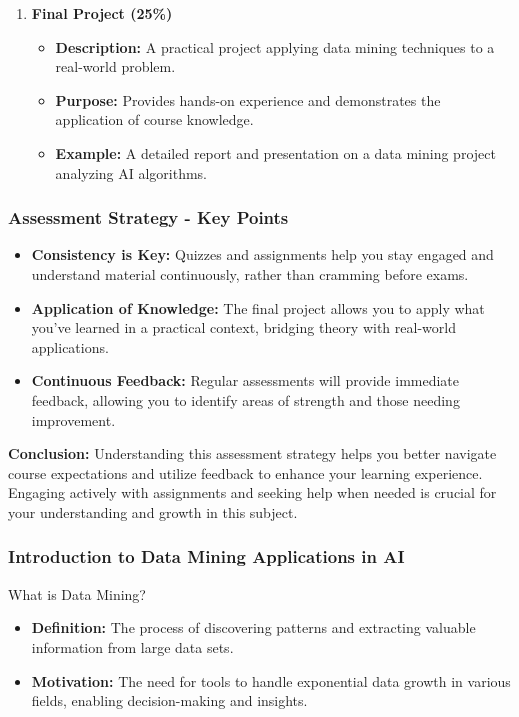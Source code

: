 \documentclass[aspectratio=169]{beamer}
\begin{document}
\begin{frame}[fragile]
\begin{enumerate}
        \item \textbf{Final Project (25\%)}
            \begin{itemize}
                \item \textbf{Description:} A practical project applying data mining techniques to a real-world problem.
                \item \textbf{Purpose:} Provides hands-on experience and demonstrates the application of course knowledge.
                \item \textbf{Example:} A detailed report and presentation on a data mining project analyzing AI algorithms.
            \end{itemize}
    \end{enumerate}
\end{frame}

\begin{frame}[fragile]
    \frametitle{Assessment Strategy - Key Points}
    \begin{itemize}
        \item \textbf{Consistency is Key:} Quizzes and assignments help you stay engaged and understand material continuously, rather than cramming before exams.
        
        \item \textbf{Application of Knowledge:} The final project allows you to apply what you've learned in a practical context, bridging theory with real-world applications.
        
        \item \textbf{Continuous Feedback:} Regular assessments will provide immediate feedback, allowing you to identify areas of strength and those needing improvement.
    \end{itemize}

    \textbf{Conclusion:} Understanding this assessment strategy helps you better navigate course expectations and utilize feedback to enhance your learning experience. Engaging actively with assignments and seeking help when needed is crucial for your understanding and growth in this subject.
\end{frame}

\begin{frame}[fragile]
    \frametitle{Introduction to Data Mining Applications in AI}
    \begin{block}{What is Data Mining?}
        \begin{itemize}
            \item \textbf{Definition:} The process of discovering patterns and extracting valuable information from large data sets.
            \item \textbf{Motivation:} The need for tools to handle exponential data growth in various fields, enabling decision-making and insights.
        \end{itemize}
    \end{block}
\end{frame}
\end{document}
